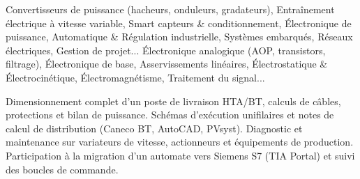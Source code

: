 \documentclass[10pt,a4paper]{../altacv}
\begin{document}
\cvidentite
{}
\makecvheader

\cvformation
{Convertisseurs de puissance (hacheurs, onduleurs, gradateurs), Entraînement électrique à vitesse variable, Smart capteurs \& conditionnement, Électronique de puissance, Automatique \& Régulation industrielle, Systèmes embarqués, Réseaux électriques, Gestion de projet...}
{Électronique analogique (AOP, transistors, filtrage), Électronique de base, Asservissements linéaires, Électrostatique \& Électrocinétique, Électromagnétisme, Traitement du signal...}

\expcore
{Dimensionnement complet d’un poste de livraison HTA/BT, calculs de câbles, protections et bilan de puissance.}
{Schémas d’exécution unifilaires et notes de calcul de distribution (Caneco BT, AutoCAD, PVsyst).}
\vspace{2pt}
\expmenara
{Diagnostic et maintenance sur variateurs de vitesse, actionneurs et équipements de production.}
{Participation à la migration d’un automate vers Siemens S7 (TIA Portal) et suivi des boucles de commande.}
\end{document}
